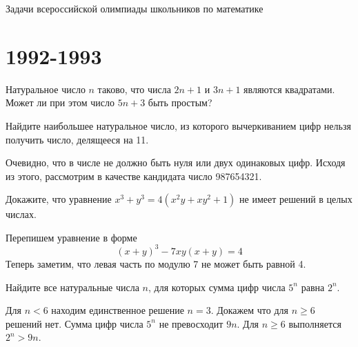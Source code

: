\documentclass[11pt, a4paper]{template}
\begin{document}
\begin{titlepage}
  \begin{center}
	\Huge{Задачи всероссийской олимпиады школьников по математике
}
  \end{center}
\end{titlepage}

\chapter{1992-1993}

\begin{exercise}
Натуральное число $n$ таково, что числа $2n + 1$ и $3n + 1$ являются
квадратами. Может ли при этом число $5n + 3$ быть простым?
\end{exercise}

\begin{solution}

\end{solution}

\begin{exercise}
Найдите наибольшее натуральное число, из которого вычеркиванием цифр нельзя получить число, делящееся на 11.
\end{exercise}

\begin{solution}
Очевидно, что в числе не должно быть нуля или двух одинаковых цифр. Исходя из этого, рассмотрим в качестве кандидата число 987654321. 
\end{solution}


\begin{exercise}
Докажите, что уравнение $x^{3} + y^{3} = 4(x^{2} y + xy^{2} + 1)$ не имеет решений в целых числах.
\end{exercise}

\begin{solution}
Перепишем уравнение в форме
$$
(x + y)^{3} - 7xy(x + y) = 4
$$
Теперь заметим, что левая часть по модулю 7 не может быть равной 4. 
\end{solution}

\begin{exercise}
Найдите все натуральные числа $n$, для которых сумма цифр числа $5^{n}$ равна $2^{n}$.
\end{exercise}

\begin{solution}
Для $n < 6$ находим единственное решение $n = 3$. Докажем что для $n \geqslant 6$
решений нет. Сумма цифр числа $5^{n}$ не превосходит $9n$. Для $n \geqslant 6$ выполняется $2^{n} > 9n$.
\end{solution}
\end{document}
